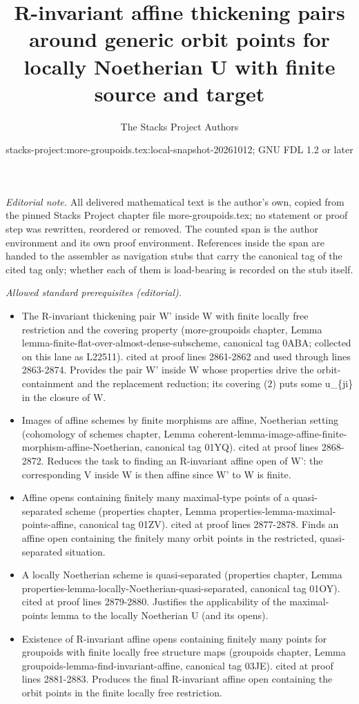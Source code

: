 \documentclass{stacks-project}
\title{R-invariant affine thickening pairs around generic orbit points for locally Noetherian U with finite source and target}
\author{The Stacks Project Authors}
\date{stacks-project:more-groupoids.tex:local-snapshot-20261012; GNU FDL 1.2 or later}
\theoremstyle{plain}
\theoremstyle{definition}
\theoremstyle{remark}
\numberwithin{equation}{subsection}
\begin{document}
\maketitle
\setcounter{subsection}{1}
\noindent\textit{Editorial note.} All delivered mathematical text is the author's own, copied from the pinned Stacks Project chapter file more-groupoids.tex; no statement or proof step was rewritten, reordered or removed. The counted span is the author environment and its own proof environment. References inside the span are handed to the assembler as navigation stubs that carry the canonical tag of the cited tag only; whether each of them is load-bearing is recorded on the stub itself.\par\medskip
\noindent\textit{Allowed standard prerequisites (editorial).}\begin{itemize}
\item The R-invariant thickening pair W' inside W with finite locally free restriction and the covering property (more-groupoids chapter, Lemma lemma-finite-flat-over-almost-dense-subscheme, canonical tag 0ABA; collected on this lane as L22511). cited at proof lines 2861-2862 and used through lines 2863-2874. Provides the pair W' inside W whose properties drive the orbit-containment and the replacement reduction; its covering (2) puts some u\_\{ji\} in the closure of W.
\item Images of affine schemes by finite morphisms are affine, Noetherian setting (cohomology of schemes chapter, Lemma coherent-lemma-image-affine-finite-morphism-affine-Noetherian, canonical tag 01YQ). cited at proof lines 2868-2872. Reduces the task to finding an R-invariant affine open of W': the corresponding V inside W is then affine since W' to W is finite.
\item Affine opens containing finitely many maximal-type points of a quasi-separated scheme (properties chapter, Lemma properties-lemma-maximal-points-affine, canonical tag 01ZV). cited at proof lines 2877-2878. Finds an affine open containing the finitely many orbit points in the restricted, quasi-separated situation.
\item A locally Noetherian scheme is quasi-separated (properties chapter, Lemma properties-lemma-locally-Noetherian-quasi-separated, canonical tag 01OY). cited at proof lines 2879-2880. Justifies the applicability of the maximal-points lemma to the locally Noetherian U (and its opens).
\item Existence of R-invariant affine opens containing finitely many points for groupoids with finite locally free structure maps (groupoids chapter, Lemma groupoids-lemma-find-invariant-affine, canonical tag 03JE). cited at proof lines 2881-2883. Produces the final R-invariant affine open containing the orbit points in the finite locally free restriction.
\end{itemize}\medskip
\end{document}
